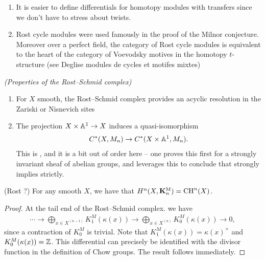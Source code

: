 \documentclass[11pt,openany]{book}
\providecommand{\KM}{\mathbf{K}^\mathrm{M}}
\begin{document}
\begin{remark} $\ $
\begin{enumerate}
    \item It is easier to define differentials for homotopy modules with transfers since we don't have to stress about twists.
    \item Rost cycle modules were used famously in the proof of the Milnor conjecture. Moreover over a perfect field, the category of Rost cycle modules is equivalent to the heart of the category of Voevodsky motives in the homotopy $t$-structure (see Deglise modules de cycles et motifes mixtes)
\end{enumerate}
\end{remark}

\begin{theorem} \textit{(Properties of the Rost--Schmid complex)}
\begin{enumerate}
    \item For $X$ smooth, the Rost--Schmid complex provides an acyclic resolution in the Zariski or Nisnevich sites
    \item The projection $X \times \mathbb{A}^1 \to X$ induces a quasi-isomorphism
    \begin{align*}
        C^\ast(X,M_n) \to C^\ast(X \times \mathbb{A}^1,M_n).
    \end{align*}
    This is \cite[5.38]{Morel}, and it is a bit out of order here -- one proves this first for a strongly invariant sheaf of abelian groups, and leverages this to conclude that strongly implies strictly.
\end{enumerate}

\end{theorem}




\begin{theorem} (Rost ?) For any smooth $X$, we have that $H^n(X,\KM_n) = \CH^n(X)$.
\end{theorem}
\begin{proof} At the tail end of the Rost--Schmid complex. we have
\begin{align*}
    \cdots \to \bigoplus_{x\in X^{(n-1)}} K_1^M (\kappa(x)) \to \bigoplus_{x\in X^{(n)}} K_0^M(\kappa(x)) \to 0,
\end{align*}
since a contraction of $K_0^M$ is trivial. Note that $K_1^M(\kappa(x)) = \kappa(x)^\times$ and $K_0^M(\kappa(x)) = \mathbb{Z}$. This differential can precisely be identified with the divisor function in the definition of Chow groups. The result follows immediately.
\end{proof}
\end{document}
